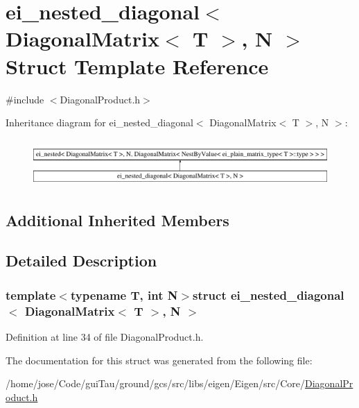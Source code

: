 \hypertarget{structei__nested__diagonal_3_01_diagonal_matrix_3_01_t_01_4_00_01_n_01_4}{\section{ei\-\_\-nested\-\_\-diagonal$<$ Diagonal\-Matrix$<$ T $>$, N $>$ Struct Template Reference}
\label{structei__nested__diagonal_3_01_diagonal_matrix_3_01_t_01_4_00_01_n_01_4}
}


{\ttfamily \#include $<$Diagonal\-Product.\-h$>$}

Inheritance diagram for ei\-\_\-nested\-\_\-diagonal$<$ Diagonal\-Matrix$<$ T $>$, N $>$\-:\begin{figure}[H]
\begin{center}
\leavevmode
\includegraphics[height=1.797753cm]{structei__nested__diagonal_3_01_diagonal_matrix_3_01_t_01_4_00_01_n_01_4}
\end{center}
\end{figure}
\subsection*{Additional Inherited Members}


\subsection{Detailed Description}
\subsubsection*{template$<$typename T, int N$>$struct ei\-\_\-nested\-\_\-diagonal$<$ Diagonal\-Matrix$<$ T $>$, N $>$}



Definition at line 34 of file Diagonal\-Product.\-h.



The documentation for this struct was generated from the following file\-:\begin{DoxyCompactItemize}
\item 
/home/jose/\-Code/gui\-Tau/ground/gcs/src/libs/eigen/\-Eigen/src/\-Core/\hyperlink{_diagonal_product_8h}{Diagonal\-Product.\-h}\end{DoxyCompactItemize}
